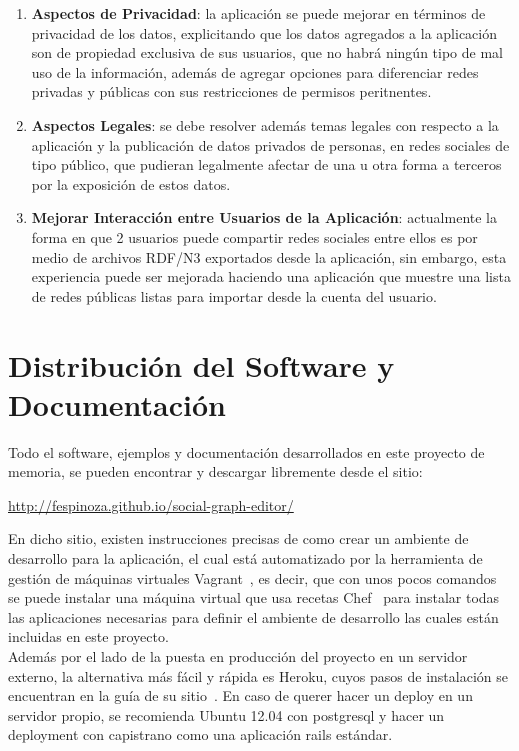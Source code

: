 \begin{enumerate}
    \item \textbf{Aspectos de Privacidad}: la aplicación se puede mejorar en términos de privacidad de los datos, explicitando que los datos agregados a la aplicación son de propiedad exclusiva de sus usuarios, que no habrá ningún tipo de mal uso de la información, además de agregar opciones para diferenciar redes privadas y públicas con sus restricciones de permisos peritnentes.
    
    \item \textbf{Aspectos Legales}: se debe resolver además temas legales con respecto a la aplicación y la publicación de datos privados de personas, en redes sociales de tipo público, que pudieran legalmente afectar de una u otra forma a terceros por la exposición de estos datos.
    
    \item \textbf{Mejorar Interacción entre Usuarios de la Aplicación}: actualmente la forma en que 2 usuarios puede compartir redes sociales entre ellos es por medio de archivos RDF/N3 exportados desde la aplicación, sin embargo, esta experiencia puede ser mejorada haciendo una aplicación que muestre una lista de redes públicas listas para importar desde la cuenta del usuario.
    
  \end{enumerate}


\section{Distribución del Software y Documentación} %
\label{sec:distribucion_del_software_y_documentacion}

Todo el software, ejemplos y documentación desarrollados en este proyecto de memoria, se pueden encontrar y descargar libremente desde el sitio:\\

\begin{center}
  \url{http://fespinoza.github.io/social-graph-editor/}
\end{center}

En dicho sitio, existen instrucciones precisas de como crear un ambiente de desarrollo para la aplicación, el cual está automatizado por la herramienta de gestión de máquinas virtuales Vagrant~\cite{vagrant}, es decir, que con unos pocos comandos se puede instalar una máquina virtual que usa recetas Chef~\cite{chef} para instalar todas las aplicaciones necesarias para definir el ambiente de desarrollo las cuales están incluidas en este proyecto.\\

Además por el lado de la puesta en producción del proyecto en un servidor externo, la alternativa más fácil y rápida es Heroku, cuyos pasos de instalación se encuentran en la guía de su sitio~\cite{heroku}. En caso de querer hacer un deploy en un servidor propio, se recomienda Ubuntu 12.04 con postgresql y hacer un deployment con capistrano como una aplicación rails estándar.

